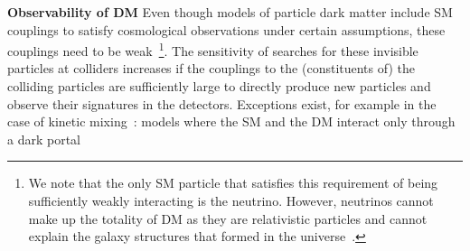\begin{textbox}[!h]
\textbf{Observability of DM}
Even though models of particle dark matter include SM couplings to satisfy cosmological observations under certain assumptions, these couplings need to be weak~\footnote{We note that the only SM particle that satisfies this requirement of being sufficiently weakly interacting is the neutrino. However, neutrinos cannot make up the totality of DM as they are relativistic particles and cannot explain the galaxy structures that formed in the  universe~\cite{PlehnLecturesDM}.}.
The sensitivity of searches for these invisible particles at colliders increases if the couplings to the (constituents of) the colliding particles are sufficiently large to directly produce new particles and observe their signatures in the detectors. 
Exceptions exist, for example in the case of kinetic mixing~\cite{Holdom:1985ag}: models where the SM and the DM interact only through a dark portal
\end{textbox}